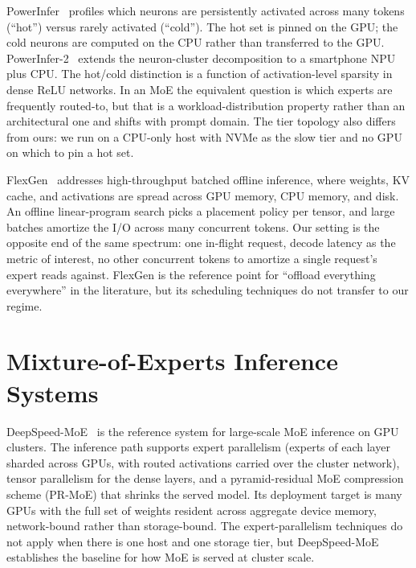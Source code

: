 PowerInfer~\cite{song2023powerinfer} profiles which neurons are persistently activated across many tokens (``hot'') versus rarely activated (``cold'').
The hot set is pinned on the GPU; the cold neurons are computed on the CPU rather than transferred to the GPU.
PowerInfer-2~\cite{xue2024powerinfer2} extends the neuron-cluster decomposition to a smartphone NPU plus CPU.
The hot/cold distinction is a function of activation-level sparsity in dense ReLU networks.
In an MoE the equivalent question is which experts are frequently routed-to, but that is a workload-distribution property rather than an architectural one and shifts with prompt domain.
The tier topology also differs from ours: we run on a CPU-only host with NVMe as the slow tier and no GPU on which to pin a hot set.

FlexGen~\cite{sheng2023flexgen} addresses high-throughput batched offline inference, where weights, KV cache, and activations are spread across GPU memory, CPU memory, and disk.
An offline linear-program search picks a placement policy per tensor, and large batches amortize the I/O across many concurrent tokens.
Our setting is the opposite end of the same spectrum: one in-flight request, decode latency as the metric of interest, no other concurrent tokens to amortize a single request's expert reads against.
FlexGen is the reference point for ``offload everything everywhere'' in the literature, but its scheduling techniques do not transfer to our regime.


\section{Mixture-of-Experts Inference Systems}\label{sec:rw-moe-systems}

DeepSpeed-MoE~\cite{rajbhandari2022deepspeedmoe} is the reference system for large-scale MoE inference on GPU clusters.
The inference path supports expert parallelism (experts of each layer sharded across GPUs, with routed activations carried over the cluster network), tensor parallelism for the dense layers, and a pyramid-residual MoE compression scheme (PR-MoE) that shrinks the served model.
Its deployment target is many GPUs with the full set of weights resident across aggregate device memory, network-bound rather than storage-bound.
The expert-parallelism techniques do not apply when there is one host and one storage tier, but DeepSpeed-MoE establishes the baseline for how MoE is served at cluster scale.


